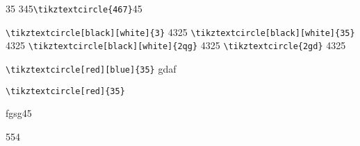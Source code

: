 \documentclass{ctexart}
\begin{document}
35 345\verb|\tikztextcircle{467}|45

 \verb|\tikztextcircle[black][white]{3}| 4325
   \verb|\tikztextcircle[black][white]{35}| 4325
  \verb|\tikztextcircle[black][white]{2qg}| 4325
    \verb|\tikztextcircle{2gd}| 4325
 
  \verb|\tikztextcircle[red][blue]{35}| gdaf
  
   \verb|\tikztextcircle[red]{35}|

fgsg45
   
\newcommand{\wcnt}{}

\wcnt5\wcnt5\wcnt4\wcnt\wcnt
\end{document}
